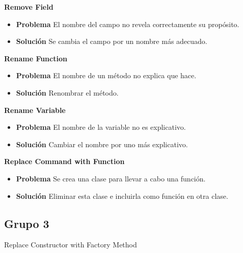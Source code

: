 \documentclass[11pt,a4paper,oneside]{book}
\begin{document}
\textbf{Remove Field}
\label{RenameField}
\begin{itemize}
    \item \textbf{Problema} El nombre del campo no revela correctamente su propósito.
    
    \item \textbf{Solución} Se cambia el campo por un nombre más adecuado.
    
\end{itemize}

\textbf{Rename Function}
\label{RenameFunction}
\begin{itemize}
    \item \textbf{Problema} El nombre de un método no explica que hace.
    
    \item \textbf{Solución} Renombrar el método.
    
\end{itemize}

\textbf{Rename Variable}
\label{RenameVariable}
\begin{itemize}
    \item \textbf{Problema} El nombre de la variable no es explicativo.
    
    \item \textbf{Solución} Cambiar el nombre por uno más explicativo.
    
\end{itemize}

\textbf{Replace Command with Function}
\label{ReplaceCommandWithFunction}
\begin{itemize}
    \item \textbf{Problema} Se crea una clase para llevar a cabo una función.
    
    \item \textbf{Solución} Eliminar esta clase e incluirla como función en otra clase.
    
\end{itemize}


\subsection{Grupo 3}
Replace Constructor with Factory Method
\end{document}
